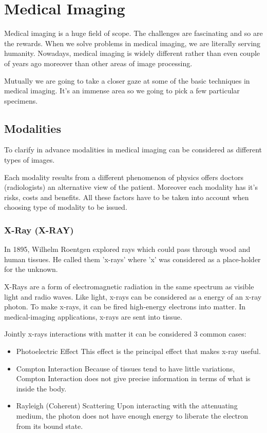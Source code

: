 \chapter{Medical Imaging}
\label{ch:rworks}

Medical imaging is a huge field of scope. The challenges are fascinating and so are the rewards. When we solve problems in medical imaging, we are literally serving humanity. Nowadays, medical imaging is widely different rather than even couple of years ago moreover than other areas of image processing. 

Mutually we are going to take a closer gaze at some of the basic techniques in medical imaging. It's an immense area so we going to pick a few particular specimens.

\section{Modalities}
To clarify in advance modalities in medical imaging can be considered as different types of images.

Each modality results from a different phenomenon of physics offers doctors (radiologists) an alternative view of the patient. Moreover each modality has it's risks, costs and benefits. All these factors have to be taken into account when choosing type of modality to be issued.

\subsection{X-Ray (X-RAY)}
In 1895, Wilhelm Roentgen explored rays which could pass through wood and human tissues. He called them \cite{Barker1996} 'x-rays' where 'x' was considered as a place-holder for the unknown.

X-Rays are a form of electromagnetic radiation in the same spectrum as visible light and radio waves. Like light, x-rays can be considered as a energy of an x-ray photon. To make x-rays, it can be fired high-energy electrons into matter. In medical-imaging applications, x-rays are sent into tissue. 

Jointly x-rays interactions with matter it can be considered 3 common cases:
\begin{itemize}
    \item Photoelectric Effect
    \newline This effect is the principal effect that makes x-ray useful.
    \item Compton Interaction
    \newline Because of tissues tend to have little variations, Compton Interaction does not give precise information in terms of what is inside the body. 
    \item Rayleigh (Coherent) Scattering
    \newline Upon interacting with the attenuating medium, the photon does not have enough energy to liberate the electron from its bound state.
\end{itemize}

